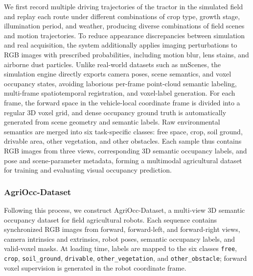 \documentclass[a4paper,fleqn]{cas-sc}
\begin{document}
We first record multiple driving trajectories of the tractor in the simulated field and replay each route under different combinations of crop type, growth stage, illumination period, and weather, producing diverse combinations of field scenes and motion trajectories. To reduce appearance discrepancies between simulation and real acquisition, the system additionally applies imaging perturbations to RGB images with prescribed probabilities, including motion blur, lens stains, and airborne dust particles. Unlike real-world datasets such as nuScenes, the simulation engine directly exports camera poses, scene semantics, and voxel occupancy states, avoiding laborious per-frame point-cloud semantic labeling, multi-frame spatiotemporal registration, and voxel-label generation. For each frame, the forward space in the vehicle-local coordinate frame is divided into a regular 3D voxel grid, and dense occupancy ground truth is automatically generated from scene geometry and semantic labels. Raw environmental semantics are merged into six task-specific classes: free space, crop, soil ground, drivable area, other vegetation, and other obstacles. Each sample thus contains RGB images from three views, corresponding 3D semantic occupancy labels, and pose and scene-parameter metadata, forming a multimodal agricultural dataset for training and evaluating visual occupancy prediction.

\subsubsection{AgriOcc-Dataset}\label{sec:agriocc_dataset}
Following this process, we construct AgriOcc-Dataset, a multi-view 3D semantic occupancy dataset for field agricultural robots. Each sequence contains synchronized RGB images from forward, forward-left, and forward-right views, camera intrinsics and extrinsics, robot poses, semantic occupancy labels, and valid-voxel masks. At loading time, labels are mapped to the six classes \texttt{free}, \texttt{crop}, \texttt{soil\_ground}, \texttt{drivable}, \texttt{other\_vegetation}, and \texttt{other\_obstacle}; forward voxel supervision is generated in the robot coordinate frame.
\end{document}
